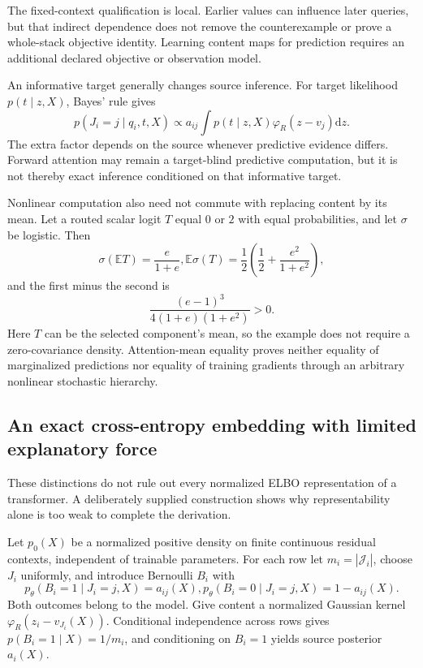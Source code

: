 \documentclass[11pt]{article}
\newcommand{\E}{\mathbb{E}}
\begin{document}
The fixed-context qualification is local. Earlier values can influence later queries, but that indirect dependence does not remove the counterexample or prove a whole-stack objective identity. Learning content maps for prediction requires an additional declared objective or observation model.

An informative target generally changes source inference. For target likelihood $p(t\mid z,X)$, Bayes' rule gives
\begin{equation}
p(J_i=j\mid q_i,t,X)\propto a_{ij}\int p(t\mid z,X)\varphi_R(z-v_j)\mathrm{d}z.
\label{eq:target-posterior}
\end{equation}
The extra factor depends on the source whenever predictive evidence differs. Forward attention may remain a target-blind predictive computation, but it is not thereby exact inference conditioned on that informative target.

Nonlinear computation also need not commute with replacing content by its mean. Let a routed scalar logit $T$ equal $0$ or $2$ with equal probabilities, and let $\sigma$ be logistic. Then
\begin{equation}
\sigma(\E T)=\frac{e}{1+e},
\E\sigma(T)=\frac12\left(\frac12+\frac{e^2}{1+e^2}\right),
\end{equation}
and the first minus the second is
\begin{equation}
\frac{(e-1)^3}{4(1+e)(1+e^2)}>0.
\label{eq:nonlinear-difference}
\end{equation}
Here $T$ can be the selected component's mean, so the example does not require a zero-covariance density. Attention-mean equality proves neither equality of marginalized predictions nor equality of training gradients through an arbitrary nonlinear stochastic hierarchy.

\subsection{An exact cross-entropy embedding with limited explanatory force}
\label{sec:manufactured}
These distinctions do not rule out every normalized ELBO representation of a transformer. A deliberately supplied construction shows why representability alone is too weak to complete the derivation.

Let $p_0(X)$ be a normalized positive density on finite continuous residual contexts, independent of trainable parameters. For each row let $m_i=|\mathcal J_i|$, choose $J_i$ uniformly, and introduce Bernoulli $B_i$ with
\begin{equation}
p_\theta(B_i=1\mid J_i=j,X)=a_{ij}(X),
p_\theta(B_i=0\mid J_i=j,X)=1-a_{ij}(X).
\label{eq:manufactured-bernoulli}
\end{equation}
Both outcomes belong to the model. Give content a normalized Gaussian kernel $\varphi_R(z_i-v_{J_i}(X))$. Conditional independence across rows gives $p(B_i=1\mid X)=1/m_i$, and conditioning on $B_i=1$ yields source posterior $a_i(X)$.
\end{document}
